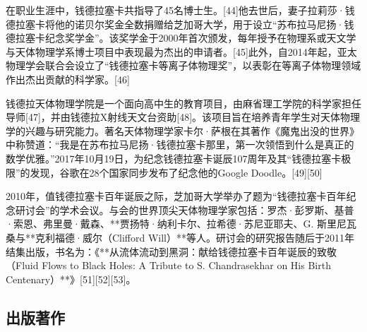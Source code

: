 在职业生涯中，钱德拉塞卡共指导了45名博士生。[44]他去世后，妻子拉莉莎·钱德拉塞卡将他的诺贝尔奖金全数捐赠给芝加哥大学，用于设立“苏布拉马尼扬·钱德拉塞卡纪念奖学金”。该奖学金于2000年首次颁发，每年授予在物理系或天文学与天体物理学系博士项目中表现最为杰出的申请者。[45]此外，自2014年起，亚太物理学会联合会设立了“钱德拉塞卡等离子体物理奖”，以表彰在等离子体物理领域作出杰出贡献的科学家。[46]

钱德拉天体物理学院是一个面向高中生的教育项目，由麻省理工学院的科学家担任导师[47]，并由钱德拉X射线天文台资助[48]。该项目旨在培养青年学生对天体物理学的兴趣与研究能力。著名天体物理学家卡尔·萨根在其著作《魔鬼出没的世界》中称赞道：“我是在苏布拉马尼扬·钱德拉塞卡那里，第一次领悟到什么是真正的数学优雅。”2017年10月19日，为纪念钱德拉塞卡诞辰107周年及其“钱德拉塞卡极限”的发现，谷歌在28个国家同步发布了纪念他的Google Doodle。[49][50]

2010年，值钱德拉塞卡百年诞辰之际，芝加哥大学举办了题为“钱德拉塞卡百年纪念研讨会”的学术会议。与会的世界顶尖天体物理学家包括：罗杰·彭罗斯、基普·索恩、弗里曼·戴森、**贾扬特·纳利卡尔、拉希德·苏尼亚耶夫、G. 斯里尼瓦桑与**克利福德·威尔（Clifford Will）**等人。研讨会的研究报告随后于2011年结集出版，书名为：《**从流体流动到黑洞：献给钱德拉塞卡百年诞辰的致敬（Fluid Flows to Black Holes: A Tribute to S. Chandrasekhar on His Birth Centenary）**》[51][52][53]。
\subsection{出版著作}
